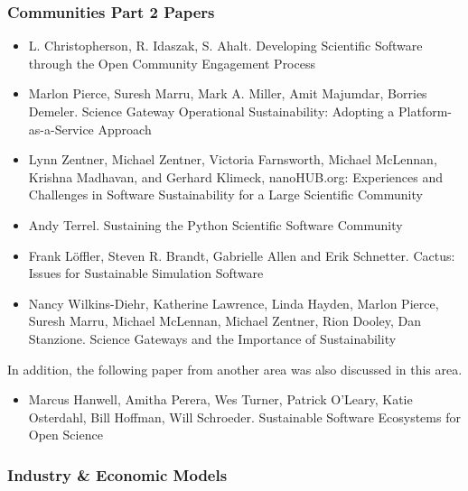 \documentclass[11pt, oneside]{amsart}
\begin{document}
\subsubsection*{Communities Part 2 Papers}

\begin{itemize}

\item L. Christopherson, R. Idaszak, S. Ahalt. Developing Scientific Software through the Open Community Engagement Process \cite{Christopherson_WSSSPE}

\item Marlon Pierce, Suresh Marru, Mark A. Miller, Amit Majumdar, Borries Demeler. Science Gateway Operational Sustainability: Adopting a Platform-as-a-Service Approach \cite{Pierce2_WSSSPE}

\item Lynn Zentner, Michael Zentner, Victoria Farnsworth, Michael
  McLennan, Krishna Madhavan, and Gerhard Klimeck, nanoHUB.org:
  Experiences and Challenges in Software Sustainability for a Large
  Scientific Community \cite{Zentner_WSSSPE}

\item Andy Terrel. Sustaining the Python Scientific Software Community
  \cite{Terrel_WSSSPE}

\item Frank L\"{o}ffler, Steven R. Brandt, Gabrielle Allen and Erik
  Schnetter. Cactus: Issues for Sustainable Simulation Software
  \cite{Loffler_WSSSPE}

\item Nancy Wilkins-Diehr, Katherine Lawrence, Linda Hayden, Marlon Pierce, Suresh Marru, Michael McLennan, Michael Zentner, Rion Dooley, Dan Stanzione. Science Gateways and the Importance of Sustainability \cite{Wilkins-Diehr_WSSSPE}

\end{itemize}

In addition, the following paper from another area was also discussed
in this area.

\begin{itemize}

\item Marcus Hanwell, Amitha Perera, Wes Turner, Patrick O'Leary,
  Katie Osterdahl, Bill Hoffman, Will Schroeder. Sustainable Software
  Ecosystems for Open Science \cite{Hanwell_WSSSPE}

\end{itemize}

\subsubsection*{Industry \& Economic Models}
\end{document}
